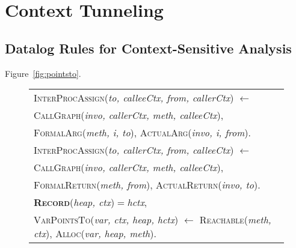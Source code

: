 \section{Context Tunneling}

\subsection{Datalog Rules for Context-Sensitive Analysis}

Figure~\ref{fig:pointsto}.


\begin{figure}[t]
\begin{tabularx}{\textwidth}{|X|}
  \hline
  \textsc{InterProcAssign}(\emph{to, calleeCtx, from, callerCtx})
  $\leftarrow$\\
  \quad \textsc{CallGraph}(\emph{invo, callerCtx, meth, calleeCtx}), \\
  \quad \textsc{FormalArg}(\emph{meth, i, to}),
  \textsc{ActualArg}(\emph{invo, i, from}).\\[1em]
  
  
  \textsc{InterProcAssign}(\emph{to, callerCtx, from, calleeCtx})
  $\leftarrow$\\
  \quad \textsc{CallGraph}(\emph{invo, callerCtx, meth, calleeCtx}), \\
  \quad \textsc{FormalReturn}(\emph{meth, from}),
  \textsc{ActualReturn}(\emph{invo, to}).\\[1em]
  
  \textbf{\textsc{Record}}(\emph{heap, ctx})$=$\emph{hctx}, \\
  \textsc{VarPointsTo}(\emph{var, ctx, heap, hctx})
  $\leftarrow$ 
  \textsc{Reachable}(\emph{meth, ctx}),
  \textsc{Alloc}(\emph{var, heap, meth}).\\[1em]
  

\end{tabularx}
\end{figure}
